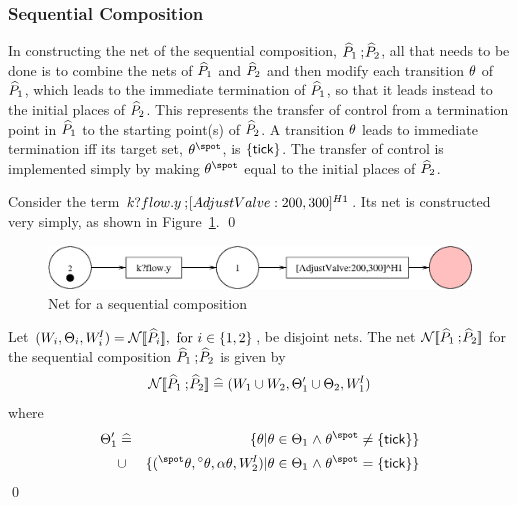 \subsubsection{Sequential Composition}
In constructing the net of the sequential composition, ${\widehat{P}}_1 \mathbin{\mathrm{;}\!}
{\widehat{P}}_2$, all that needs to be done is to combine the nets of ${\widehat{P}}_1$ and 
${\widehat{P}}_2$ and then modify each transition $\theta$ of ${\widehat{P}}_1$, which leads
to the immediate termination of ${\widehat{P}}_1$, so that it leads instead to
the initial places of ${\widehat{P}}_2$. This represents the transfer of control
from a termination point in ${\widehat{P}}_1$ to the starting point(s) of
${\widehat{P}}_2$.  A transition $\theta$ leads to immediate termination iff its
target set, $\postset{\tr}$, is $\{{\sf tick}\}$. The transfer of control
is implemented simply by making $\postset{\tr}$ equal to the initial
places of ${\widehat{P}}_2$.
\begin{exampleb}
Consider the term ${k}?flow.y \mathbin{\mathrm{;}\!} [AdjustValve:200,300]^{{H1}}$.  Its
net is constructed very simply, as shown in Figure~\ref{fig:seqnet}.
\qed
\end{exampleb}
\begin{figure}[h]
\begin{center}
\includegraphics[width=.8\linewidth]{TGGEN/seq.eps}
\end{center}
\caption{Net for a sequential composition\label{fig:seqnet}}
\end{figure}   
\begin{definition}
Let $(W_i,\Theta_i,W^{\!I}_i) = {\mathcal{N}[\![{\widehat{P}}_i]\!]}, \text{ for } i \in \{1,2\}$, be 
disjoint nets. The net ${\mathcal{N}[\![{\widehat{P}}_1 \mathbin{\mathrm{;}\!} {\widehat{P}}_2]\!]}$ for the sequential
composition ${\widehat{P}}_1 \mathbin{\mathrm{;}\!} {\widehat{P}}_2$ is given by
\[{\mathcal{N}[\![{\widehat{P}}_1 \mathbin{\mathrm{;}\!} {\widehat{P}}_2]\!]} \mathrel{\widehat=} (W_1 \cup W_2, \Theta'_1 \cup \Theta_2,W^{\!I}_1)\] where
\begin{eqnarray}
\T'_1 & \defs & \{\tr | \tr \in \T_1 \land \postset{\tr} \neq \{\tickpl\}\} \nonumber
\\[.3mm]
& \cup & \{ (\preset{\tr},\vset{\tr},\attr{\tr},\WI_2) | \tr \in \T_1
\land \postset{\tr} = \{\tickpl\}\} \nonumber 
\end{eqnarray}
\qed
\end{definition}

